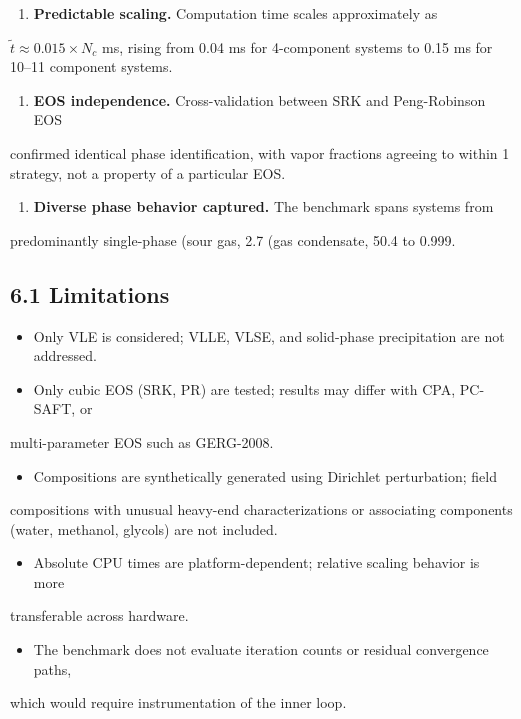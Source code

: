 \documentclass[review,3p]{custom}
\begin{document}
{\begin{enumerate}
  \item \textbf{Predictable scaling.} Computation time scales approximately as
\end{enumerate}
   $\tilde{t} \approx 0.015 \times N_c$ ms, rising from 0.04 ms for 4-component
   systems to 0.15 ms for 10–11 component systems.

\begin{enumerate}
  \item \textbf{EOS independence.} Cross-validation between SRK and Peng-Robinson EOS
\end{enumerate}
   confirmed identical phase identification, with vapor fractions agreeing to
   within 1%
   strategy, not a property of a particular EOS.

\begin{enumerate}
  \item \textbf{Diverse phase behavior captured.} The benchmark spans systems from
\end{enumerate}
   predominantly single-phase (sour gas, 2.7%
   (gas condensate, 50.4%
   to 0.999.

\subsection{6.1 Limitations}

\begin{itemize}
  \item Only VLE is considered; VLLE, VLSE, and solid-phase precipitation are not addressed.
  \item Only cubic EOS (SRK, PR) are tested; results may differ with CPA, PC-SAFT, or
\end{itemize}
  multi-parameter EOS such as GERG-2008.
\begin{itemize}
  \item Compositions are synthetically generated using Dirichlet perturbation; field
\end{itemize}
  compositions with unusual heavy-end characterizations or associating components
  (water, methanol, glycols) are not included.
\begin{itemize}
  \item Absolute CPU times are platform-dependent; relative scaling behavior is more
\end{itemize}
  transferable across hardware.
\begin{itemize}
  \item The benchmark does not evaluate iteration counts or residual convergence paths,
\end{itemize}
  which would require instrumentation of the inner loop.

}
\end{document}
